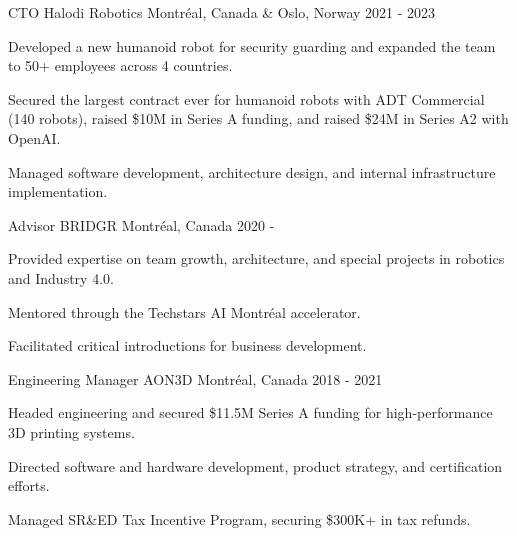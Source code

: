 \documentclass[11pt, letterpaper]{awesome-cv}
\begin{document}
\makecvheader

\begin{cventries}


    \cventry
    {CTO}
    {Halodi Robotics}
    {Montréal, Canada \& Oslo, Norway}
    {2021 - 2023}
    {
        \begin{cvitems}
            \item{Developed a new humanoid robot for security guarding and expanded the team to 50+ employees across 4 countries.}
            \item{Secured the largest contract ever for humanoid robots with ADT Commercial (140 robots), raised \$10M in Series A funding, and raised \$24M in Series A2 with OpenAI.}
            \item{Managed software development, architecture design, and internal infrastructure implementation.}
        \end{cvitems}
    }

    \cventry
    {Advisor}
    {BRIDGR}
    {Montréal, Canada}
    {2020 - }
    {
        \begin{cvitems}
            \item{Provided expertise on team growth, architecture, and special projects in robotics and Industry 4.0.}
            \item{Mentored through the Techstars AI Montréal accelerator.}
            \item{Facilitated critical introductions for business development.}
        \end{cvitems}
    }

    \cventry
    {Engineering Manager}
    {AON3D}
    {Montréal, Canada}
    {2018 - 2021}
    {
        \begin{cvitems}
            \item{Headed engineering and secured \$11.5M Series A funding for high-performance 3D printing systems.}
            \item{Directed software and hardware development, product strategy, and certification efforts.}
            \item{Managed SR\&ED Tax Incentive Program, securing \$300K+ in tax refunds.}
        \end{cvitems}
    }



\end{cventries}
\end{document}
